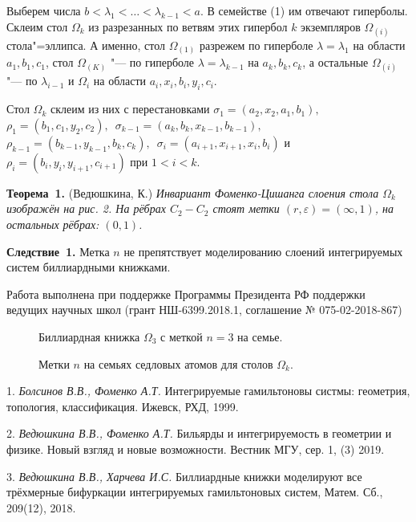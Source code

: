 Выберем числа $b < \lambda_1 < \dots < \lambda_{k-1} < a$. В семействе (1) им отвечают гиперболы. Склеим стол $\Omega_k$ из разрезанных по ветвям этих гипербол $k$ экземпляров $\Omega_{(i)}$ стола"=эллипса. А именно, стол $\Omega_{(1)}$ разрежем по гиперболе $\lambda = \lambda_1$ на области $a_1, b_1, c_1$, стол $\Omega_{(K)}$ "--- по гиперболе $\lambda = \lambda_{k-1}$ на $a_k, b_k, c_k$, а остальные $\Omega_{(i)}$ "--- по $\lambda_{i-1}$ и $\Omega_i$ на области $a_i, x_i, b_i, y_i, c_i$.

Стол $\Omega_k$ склеим из них с перестановками $\sigma_1 = (a_2, x_2, a_1, b_1),$\, $\rho_1 = (b_1, c_1, y_2, c_2),$\, $\sigma_{k-1} = (a_{k}, b_{k}, x_{k-1}, b_{k-1}) ,$\, $\rho_{k-1} = (b_{k-1}, y_{k-1}, b_{k}, c_{k}),$\, $\sigma_i = (a_{i+1}, x_{i+1}, x_i, b_i)$ и $\rho_i = (b_{i}, y_{i}, y_{i+1}, c_{i+1})$ при $1 < i < k$.

\textbf{Теорема~1.} (Ведюшкина, К.) {\it Инвариант Фоменко\--Цишанга слоения стола $\Omega_k$ изображён на рис. 2. На рёбрах $C_2 - C_2$ стоят метки $(r, \varepsilon) = (\infty, 1)$, на остальных рёбрах: $(0, 1)$.}

\textbf{Следствие~1.} Метка $n$ не препятствует моделированию слоений интегрируемых систем биллиардными книжками.

Работа выполнена при поддержке Программы Президента РФ поддержки ведущих научных школ (грант НШ-6399.2018.1, соглашение № 075-02-2018-867)




 \begin{figure}[h!]
\caption{Биллиардная книжка $\Omega_3$ с меткой $n = 3$ на семье.} \label{WildMol}
 \end{figure}


 \begin{figure}[h!]
\caption{Метки $n$ на семьях седловых атомов для столов $\Omega_k$.} \label{WildMol}
 \end{figure}









\litlist

1. {\it Болсинов В.В., Фоменко А.Т.} Интегрируемые гамильтоновы систмы: геометрия, топология, классификация. Ижевск, РХД, 1999.


2. {\it Ведюшкина В.В., Фоменко А.Т.} Бильярды и интегрируемость в геометрии и физике. Новый взгляд и новые возможности. Вестник МГУ, сер. 1, (3) 2019.

3. {\it Ведюшкина В.В., Харчева И.С.} Биллиардные книжки моделируют все трёхмерные бифуркации интегрируемых гамильтоновых систем, Матем. Сб., 209(12), 2018.

